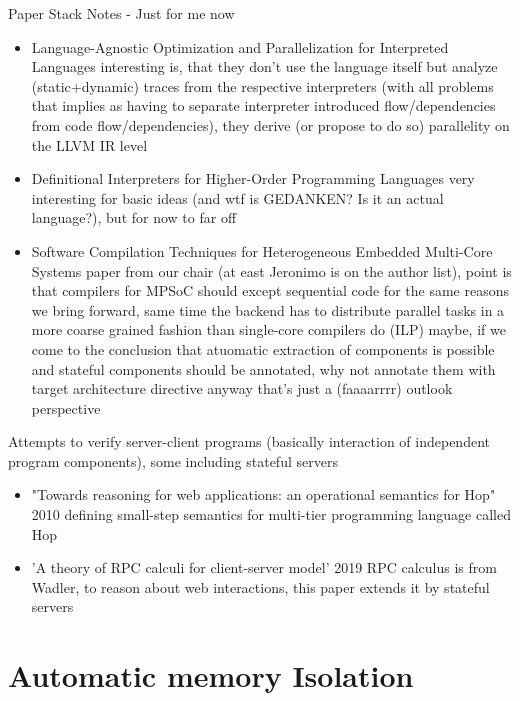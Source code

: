 Paper Stack Notes - Just for me now
\begin{itemize}
    \item Language-Agnostic Optimization and Parallelization for Interpreted Languages \means interesting is, that they don't use the language itself but analyze (static+dynamic) traces from the respective interpreters (with all problems that implies as having to separate interpreter introduced flow/dependencies from code flow/dependencies), they derive (or propose to do so) parallelity on the LLVM IR level
    \item Definitional Interpreters for Higher-Order Programming Languages \means very interesting for basic ideas (and wtf is GEDANKEN? Is it an actual language?), but for now to far off
    \item Software Compilation Techniques for
Heterogeneous Embedded Multi-Core Systems \means paper from our chair (at east Jeronimo is on the author list), point is that compilers for MPSoC should except sequential code for the same reasons we bring forward, same time the backend has to distribute parallel tasks in a more coarse grained fashion than single-core compilers do (ILP) \means maybe, if we come to the conclusion that atuomatic extraction of components is possible and stateful components should be annotated, why not annotate them with target architecture directive \means anyway that's just a (faaaarrrr) outlook perspective
\end{itemize}


Attempts to verify server-client programs (basically interaction of independent program components), some including stateful servers
\begin{itemize}
    \item "Towards reasoning for web applications: an operational semantics for Hop" 2010 \means defining small-step semantics for multi-tier programming language called Hop
    \item 'A theory of RPC calculi for client-server model' 2019 \means RPC calculus is from Wadler, to reason about web interactions, this paper extends it by stateful servers  
\end{itemize}

\section{Automatic memory Isolation}


